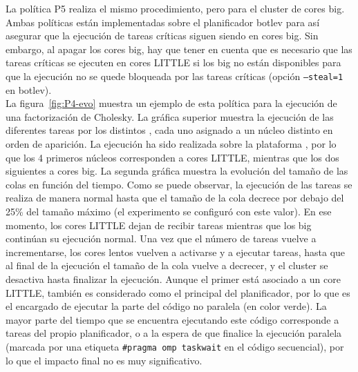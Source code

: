 La política P5 realiza el mismo procedimiento, pero para el cluster de
cores big. Ambas políticas están implementadas sobre el planificador botlev
para así asegurar que la ejecución de tareas críticas siguen siendo en
cores big. Sin embargo, al apagar los cores big, hay que tener en cuenta
que es necesario que las tareas críticas se ejecuten en cores LITTLE si los
big no están disponibles para que la ejecución no se quede bloqueada por
las tareas críticas (opción \texttt{--steal=1} en botlev).\\
La figura~\ref{fig:P4-evo} muestra un ejemplo de esta política para la
ejecución de una factorización de Cholesky. La gráfica superior muestra la
ejecución de las diferentes tareas por los distintos \wts, cada uno
asignado a un núcleo distinto en orden de aparición. La ejecución ha sido
realizada sobre la plataforma \juno, por lo que los 4 primeros núcleos
corresponden a cores LITTLE, mientras que los dos siguientes a cores
big. La segunda gráfica muestra la evolución del tamaño de las colas en
función del tiempo. Como se puede observar, la ejecución de las tareas se
realiza de manera normal hasta que el tamaño de la cola decrece por debajo
del 25\% del tamaño máximo (el experimento se configuró con este valor). En
ese momento, los cores LITTLE dejan de recibir tareas mientras que los big
continúan su ejecución normal. Una vez que el número de tareas vuelve a
incrementarse, los cores lentos vuelven a activarse y a ejecutar tareas,
hasta que al final de la ejecución el tamaño de la cola vuelve a decrecer,
y el cluster se desactiva hasta finalizar la ejecución. Aunque el primer
\wt está asociado a un core LITTLE, también es considerado como el \wt
principal del planificador, por lo que es el encargado de ejecutar la parte
del código no paralela (en color verde). La mayor parte del tiempo que se
encuentra ejecutando este código corresponde a tareas del propio
planificador, o a la espera de que finalice la ejecución paralela (marcada
por una etiqueta \texttt{\#pragma omp taskwait} en el código secuencial),
por lo que el impacto final no es muy significativo.



